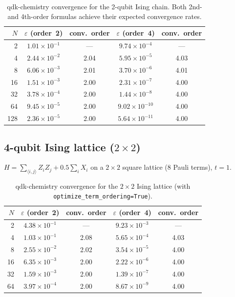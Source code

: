 \documentclass[11pt]{article}
\begin{document}
\begin{table}[h]
\centering
\begin{tabular}{rcccc}
\toprule
$N$ & $\varepsilon$ (order~2) & conv.\ order & $\varepsilon$ (order~4) & conv.\ order \\
\midrule
  2 & $1.01 \times 10^{-1}$ & --- & $9.74 \times 10^{-4}$ & --- \\
  4 & $2.44 \times 10^{-2}$ & 2.04 & $5.95 \times 10^{-5}$ & 4.03 \\
  8 & $6.06 \times 10^{-3}$ & 2.01 & $3.70 \times 10^{-6}$ & 4.01 \\
 16 & $1.51 \times 10^{-3}$ & 2.00 & $2.31 \times 10^{-7}$ & 4.00 \\
 32 & $3.78 \times 10^{-4}$ & 2.00 & $1.44 \times 10^{-8}$ & 4.00 \\
 64 & $9.45 \times 10^{-5}$ & 2.00 & $9.02 \times 10^{-10}$ & 4.00 \\
128 & $2.36 \times 10^{-5}$ & 2.00 & $5.64 \times 10^{-11}$ & 4.00 \\
\bottomrule
\end{tabular}
\caption{qdk-chemistry convergence for the 2-qubit Ising chain.
Both 2nd- and 4th-order formulas achieve their expected convergence rates.}
\end{table}

\subsection{4-qubit Ising lattice ($2\times 2$)}

$H = \sum_{\langle i,j\rangle} Z_i Z_j + 0.5 \sum_i X_i$ on a $2 \times 2$
square lattice (8 Pauli terms), $t = 1$.

\begin{table}[h]
\centering
\begin{tabular}{rcccc}
\toprule
$N$ & $\varepsilon$ (order~2) & conv.\ order & $\varepsilon$ (order~4) & conv.\ order \\
\midrule
 2 & $4.38 \times 10^{-1}$ & --- & $9.23 \times 10^{-3}$ & --- \\
 4 & $1.03 \times 10^{-1}$ & 2.08 & $5.65 \times 10^{-4}$ & 4.03 \\
 8 & $2.55 \times 10^{-2}$ & 2.02 & $3.54 \times 10^{-5}$ & 4.00 \\
16 & $6.35 \times 10^{-3}$ & 2.00 & $2.22 \times 10^{-6}$ & 4.00 \\
32 & $1.59 \times 10^{-3}$ & 2.00 & $1.39 \times 10^{-7}$ & 4.00 \\
64 & $3.97 \times 10^{-4}$ & 2.00 & $8.67 \times 10^{-9}$ & 4.00 \\
\bottomrule
\end{tabular}
\caption{qdk-chemistry convergence for the $2\times 2$ Ising lattice
(with \texttt{optimize\_term\_ordering=True}).}
\end{table}
\end{document}
